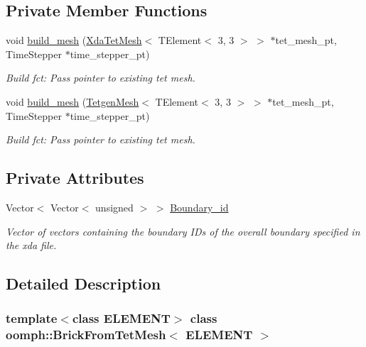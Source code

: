 \subsection*{Private Member Functions}
\begin{DoxyCompactItemize}
\item 
void \hyperlink{classoomph_1_1BrickFromTetMesh_a9b81e29d3b000f02764bf367fa762bfb}{build\+\_\+mesh} (\hyperlink{classoomph_1_1XdaTetMesh}{Xda\+Tet\+Mesh}$<$ T\+Element$<$ 3, 3 $>$ $>$ $\ast$tet\+\_\+mesh\+\_\+pt, Time\+Stepper $\ast$time\+\_\+stepper\+\_\+pt)
\begin{DoxyCompactList}\small\item\em Build fct\+: Pass pointer to existing tet mesh. \end{DoxyCompactList}\item 
void \hyperlink{classoomph_1_1BrickFromTetMesh_afd36d1606f796e926c61b1112b3b6117}{build\+\_\+mesh} (\hyperlink{classoomph_1_1TetgenMesh}{Tetgen\+Mesh}$<$ T\+Element$<$ 3, 3 $>$ $>$ $\ast$tet\+\_\+mesh\+\_\+pt, Time\+Stepper $\ast$time\+\_\+stepper\+\_\+pt)
\begin{DoxyCompactList}\small\item\em Build fct\+: Pass pointer to existing tet mesh. \end{DoxyCompactList}\end{DoxyCompactItemize}
\subsection*{Private Attributes}
\begin{DoxyCompactItemize}
\item 
Vector$<$ Vector$<$ unsigned $>$ $>$ \hyperlink{classoomph_1_1BrickFromTetMesh_a0f6a4b80993ee015038c36ff1aa5556f}{Boundary\+\_\+id}
\begin{DoxyCompactList}\small\item\em Vector of vectors containing the boundary I\+Ds of the overall boundary specified in the xda file. \end{DoxyCompactList}\end{DoxyCompactItemize}


\subsection{Detailed Description}
\subsubsection*{template$<$class E\+L\+E\+M\+E\+NT$>$\newline
class oomph\+::\+Brick\+From\+Tet\+Mesh$<$ E\+L\+E\+M\+E\+N\+T $>$}

